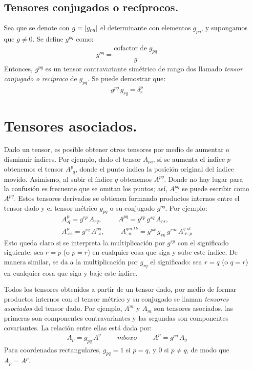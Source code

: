 \subsection*{Tensores conjugados o recíprocos.}

Sea que se denote con $g = \abs{g_{pq}}$ el determinante con elementos $g_{pq}$, y supongamos que $g \neq 0$. Se define $g^{pq}$ como:
\begin{align*}
g^{pq} = \dfrac{\mbox{cofactor de } g_{pq}}{g}
\end{align*}
Entonces, $g^{pq}$ es un tensor contravariante simétrico de rango dos llamado \emph{tensor conjugado o recíproco} de $g_{pq}$. Se puede demostrar que:
\begin{align*}
g^{pq} \, g_{rq} = \delta_{r}^{p}
\end{align*}

\section{Tensores asociados.}

Dado un tensor, es posible obtener otros tensores por medio de aumentar o disminuir índices. Por ejemplo, dado el tensor $A_{pq}$, si se aumenta el índice $p$ obtenemos el tensor $A_{\, . q}^{p}$, donde el punto indica la posición original del índice movido. Asimismo, al subir el índice $q$ obtenemos $A_{..}^{pq}$. Donde no hay lugar para la confusión es frecuente que se omitan los puntos; así, $A_{..}^{pq}$ se puede escribir como $A^{pq}$. Estos tensores derivados se obtienen formando productos internos entre el tensor dado y el tensor métrico $g_{pq}$ o su conjugado $g^{pq}$. Por ejemplo:
\begin{align*}
A_{. q}^{p} = g^{rp} \, A_{rq}, \hspace{1cm} A^{pq} = g^{rp} \, g^{sq} \, A_{rs}, \\[0.5em]
A_{. rs}^{p} = g^{rq} \, A_{.. s}^{pq}, \hspace{1cm} A_{..n}^{qm . tk} = g^{pk} \, g_{sn} \, g^{rm} \, A_{. r .. p}^{q . st}
\end{align*}
Esto queda claro si se interpreta la multiplicación por $g^{rp}$ con el significado siguiente: sea $r = p$ (o $p = r$) en cualquier cosa que siga y sube este índice. De manera similar, se da a la multiplicación por $g_{rq}$ el significado: sea $r = q$ (o $q = r$) en cualquier cosa que siga y baje este índice.
\par
Todos los tensores obtenidos a partir de un tensor dado, por medio de formar productos internos con el tensor métrico y su conjugado se llaman \emph{tensores asociados} del tensor dado. Por ejemplo, $A^{m}$ y $A_{m}$ son tensores asociados, las primeras son componentes contravariantes y las segundas son componentes covariantes. La relación entre ellas está dada por:
\begin{align*}
A_{p} = g_{pq} \, A^{q} \hspace{1cm} {mbox{o}} \hspace{1cm} A^{p} = g^{pq} \, A_{q}
\end{align*}
Para coordenadas rectangulares, $g_{pq} = 1$ si $p = q$, y $0$ si $p \neq q$, de modo que $A_{p} = A^{p}$.

